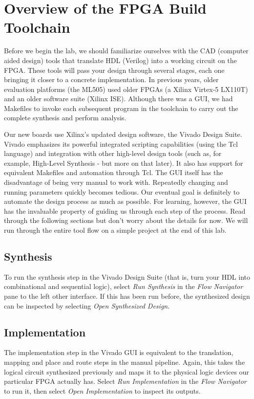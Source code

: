 \documentclass[11pt]{article}
\begin{document}
\section{Overview of the FPGA Build Toolchain}

Before we begin the lab, we should familiarize ourselves with the CAD (computer aided design) tools that translate HDL (Verilog) into a working circuit on the FPGA. These tools will pass your design through several stages, each one bringing it closer to a concrete implementation. In previous years, older evaluation platforms (the ML505) used older FPGAs (a Xilinx Virtex-5 LX110T) and an older software suite (Xilinx ISE). Although there was a GUI, we had Makefiles to invoke each subsequent program in the toolchain to carry out the complete synthesis and perform analysis.

Our new boards use Xilinx's updated design software, the Vivado Design Suite. Vivado emphasizes its powerful integrated scripting capabilities (using the Tcl language) and integration with other high-level design tools (such as, for example, High-Level Synthesis - but more on that later). It also has support for equivalent Makefiles and automation through Tcl. The GUI itself has the disadvantage of being very manual to work with. Repeatedly changing and running parameters quickly becomes tedious. Our eventual goal is definitely to automate the design process as much as possible. For learning, however, the GUI has the invaluable property of guiding us through each step of the process. Read through the following sections but don't worry about the details for now. We will run through the entire tool flow on a simple project at the end of this lab.

\subsection{Synthesis}

To run the synthesis step in the Vivado Design Suite (that is, turn your HDL into combinational and sequential logic), select \emph{Run Synthesis} in the \emph{Flow Navigator} pane to the left other interface. If this has been run before, the synthesized design can be inspected by selecting \emph{Open Synthesized Design}.

\subsection{Implementation}

The implementation step in the Vivado GUI is equivalent to the translation, mapping and place and route steps in the manual pipeline. Again, this takes the logical circuit synthesized previously and maps it to the physical logic devices our particular FPGA actually has. Select \emph{Run Implementation} in the \emph{Flow Navigator} to run it, then select \emph{Open Implementation} to inspect its outputs.
\end{document}
